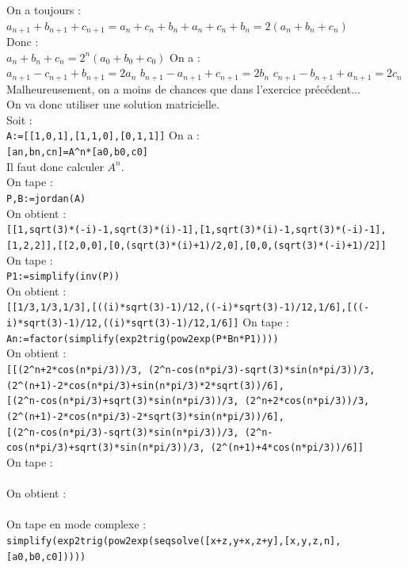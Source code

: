\documentclass[a4paper,11pt]{book}
\begin{document}
\begin{enumerate}
On a toujours :\\
$a_{n+1}+b_{n+1}+c_{n+1}=a_n+c_n+b_n+a_n+c_n+b_n=2(a_n+b_n+c_n)$\\
Donc :\\
$a_n+b_n+c_n=2^n(a_0+b_0+c_0)$
On a :\\
$a_{n+1}-c_{n+1}+b_{n+1}=2a_n$
$b_{n+1}-a_{n+1}+c_{n+1}=2b_n$
$c_{n+1}-b_{n+1}+a_{n+1}=2c_n$
Malheureusement, on a moins de chances que dans l'exercice pr\'ec\'edent...\\
On va donc utiliser une solution matricielle.\\
Soit :\\
{\tt A:=[[1,0,1],[1,1,0],[0,1,1]]}
On a :\\
{\tt [an,bn,cn]=A\verb|^|n*[a0,b0,c0]}\\
Il faut donc calculer $A^n$.\\
On tape :\\
{\tt P,B:=jordan(A)}\\
On obtient :\\
{\tt [[1,sqrt(3)*(-i)-1,sqrt(3)*(i)-1],[1,sqrt(3)*(i)-1,sqrt(3)*(-i)-1],[1,2,2]],[[2,0,0],[0,(sqrt(3)*(i)+1)/2,0],[0,0,(sqrt(3)*(-i)+1)/2]]}\\
On tape :\\
{\tt P1:=simplify(inv(P))}\\
On obtient :\\
{\tt [[1/3,1/3,1/3],[((i)*sqrt(3)-1)/12,((-i)*sqrt(3)-1)/12,1/6],[((-i)*sqrt(3)-1)/12,((i)*sqrt(3)-1)/12,1/6]]}
On tape :\\
{\tt An:=factor(simplify(exp2trig(pow2exp(P*Bn*P1))))}\\
On obtient :\\
{\tt [[(2\verb|^|n+2*cos(n*pi/3))/3, (2\verb|^|n-cos(n*pi/3)-sqrt(3)*sin(n*pi/3))/3, (2\verb|^|(n+1)-2*cos(n*pi/3)+sin(n*pi/3)*2*sqrt(3))/6],}\\
{\tt [(2\verb|^|n-cos(n*pi/3)+sqrt(3)*sin(n*pi/3))/3, (2\verb|^|n+2*cos(n*pi/3))/3, (2\verb|^|(n+1)-2*cos(n*pi/3)-2*sqrt(3)*sin(n*pi/3))/6],}\\
{\tt [(2\verb|^|n-cos(n*pi/3)-sqrt(3)*sin(n*pi/3))/3, (2\verb|^|n-cos(n*pi/3)+sqrt(3)*sin(n*pi/3))/3, (2\verb|^|(n+1)+4*cos(n*pi/3))/6]]}\\
On tape :\\
{\tt }\\
On obtient :\\
{\tt }\\
On tape en mode complexe :\\
{\tt simplify(exp2trig(pow2exp(seqsolve([x+z,y+x,z+y],[x,y,z,n],[a0,b0,c0]))))}\\

\end{enumerate}
\end{document}
